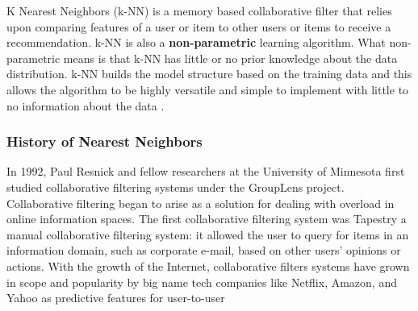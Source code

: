 \documentclass{report}
\begin{document}
K Nearest Neighbors (k-NN) is a memory based collaborative filter that relies upon comparing features of a user or item to other users or items to receive a recommendation. 
k-NN is also a \textbf{non-parametric} learning algorithm. What non-parametric means is that k-NN has little or no prior knowledge about the data distribution. k-NN  builds the model structure based on the training data and this allows the algorithm to be highly versatile and simple to implement with little to no information about the data \cite{3}. 

\subsubsection*{History of Nearest Neighbors}

In 1992, Paul Resnick and fellow researchers at the University of Minnesota first studied collaborative filtering systems under the GroupLens project\cite{2}.  Collaborative filtering began to arise as a solution for dealing with overload in online information spaces. The first collaborative filtering system was Tapestry
a manual collaborative filtering system: it allowed the user to query for
items in an information domain, such as corporate e-mail, based on
other users’ opinions or actions\cite{6}. With the growth of the Internet, collaborative filters systems have grown in scope and popularity by big name tech companies like Netflix, Amazon, and Yahoo as predictive features for user-to-user 
\end{document}
